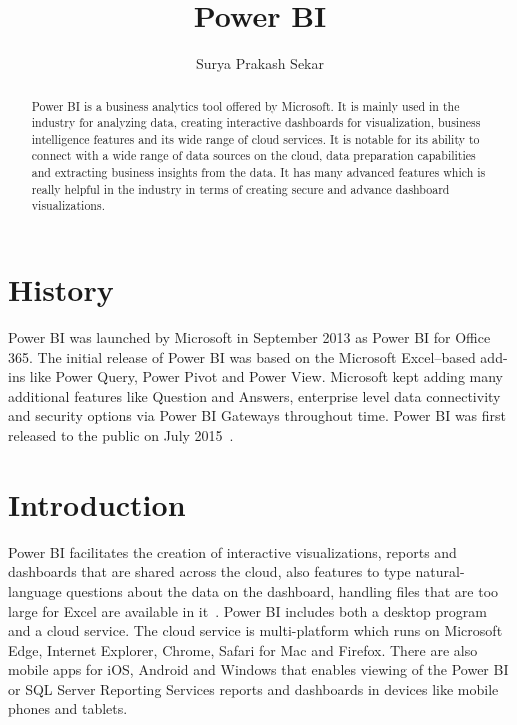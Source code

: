 
\title{Power BI}

\author{Surya Prakash Sekar}

\renewcommand{\shortauthors}{Surya}

\begin{abstract}
Power BI is a business analytics tool offered by Microsoft. It is mainly used 
in the industry for analyzing data, creating interactive dashboards for 
visualization, business intelligence features and its wide range of cloud 
services. It is notable for its ability to connect with a wide range of data 
sources on the cloud, data preparation capabilities and extracting business 
insights from the data. It has many advanced features which is really helpful 
in the industry in terms of creating secure and advance dashboard visualizations.
\end{abstract}


\maketitle

\section{History}
Power BI was launched by Microsoft in September 2013 as Power BI for 
Office 365. The initial release of Power BI was based on the Microsoft 
Excel–based add-ins like Power Query, Power Pivot and Power View. Microsoft kept 
adding many additional features like Question and Answers, enterprise level 
data connectivity and security options via Power BI Gateways throughout time. 
Power BI was first released to the public on July 2015~\cite{hid-sp18-418-powerbi-history}.

\section{Introduction}
Power BI facilitates the creation of interactive visualizations, reports and 
dashboards that are shared across the cloud, also features to type 
natural-language questions about the data on the dashboard, handling files 
that are too large for Excel are available in it~\cite{hid-sp18-418-powerbi-intro}.
Power BI includes both a desktop program and a cloud service. The cloud service 
is multi-platform which runs on Microsoft Edge, Internet Explorer, Chrome, 
Safari for Mac and Firefox. There are also mobile apps for iOS, Android and 
Windows that enables viewing of the Power BI or SQL Server Reporting Services 
reports and dashboards in devices like mobile phones and tablets.

